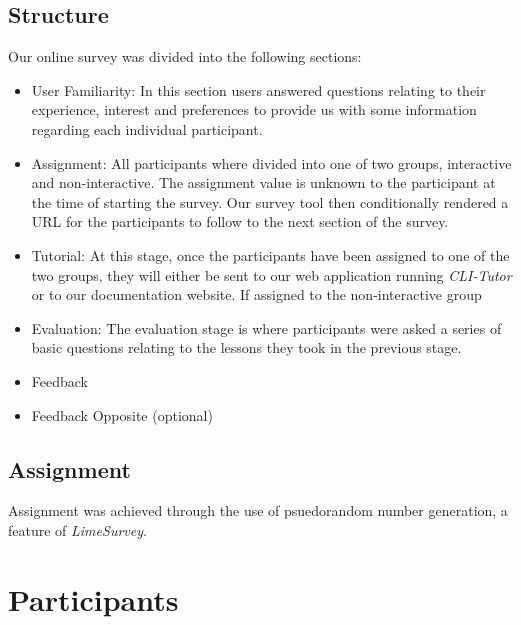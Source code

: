 \subsection{Structure}


Our online survey was divided into the following sections:

\begin{itemize}

    \item User Familiarity: In this section users answered questions relating
        to their experience, interest and preferences to provide us with some
        information regarding each individual participant.

    \item Assignment: All participants where divided into one of two groups,
        interactive and non-interactive. The assignment value is unknown to the
        participant at the time of starting the survey. Our survey tool then
        conditionally rendered a URL for the participants to follow to the next
        section of the survey.

    \item Tutorial: At this stage, once the participants have been assigned to
        one of the two groups, they will either be sent to our web application
        running \textit{CLI-Tutor} or to our documentation website. If assigned
        to the non-interactive group

    \item Evaluation: The evaluation stage is where participants were asked a
        series of basic questions relating to the lessons they took in the
        previous stage.

    \item Feedback

    \item Feedback Opposite (optional)
\end{itemize}

\subsection{Assignment}

Assignment was achieved through the use of psuedorandom number generation, a
feature of \textit{LimeSurvey}.

\section{Participants}

